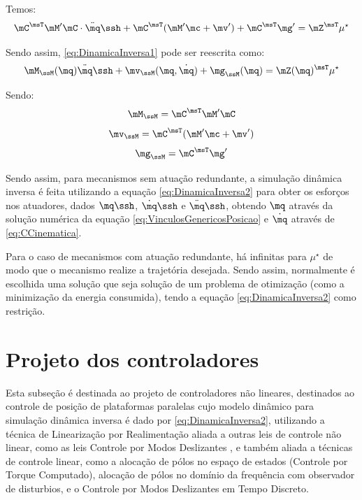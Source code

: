 \documentclass[]{politex}
\begin{document}
Temos:
\begin{equation} \label{eq:DinamicaInversa1}
\mC^\msT \mM' \mC \cdot \ddot{\mq}\ssh + \mC^\msT (   \mM' \mc + \mv' ) + \mC^\msT \mg'  = \mZ^\msT \mu^\star
\end{equation}

Sendo assim, \eqref{eq:DinamicaInversa1} pode ser reescrita como:
\begin{equation} \label{eq:DinamicaInversa2}
\mM_{\ssM} (\mq) \ddot{\mq}\ssh + \mv_{\ssM}(\mq, \dot{\mq}) + \mg_{\ssM}(\mq)   = \mZ(\mq)^{\msT} \mu^\star
\end{equation}

Sendo: 
\begin{equation}
\mM_{\ssM}  =  \mC^\msT \mM' \mC
\end{equation}
\begin{equation}
\mv_{\ssM}  =  \mC^\msT (  \mM'  \mc  + \mv' )
\end{equation}
\begin{equation}
\mg_{\ssM}  = \mC^\msT \mg'
\end{equation}

Sendo assim, para mecanismos sem atuação redundante, a simulação dinâmica inversa é feita utilizando a equação \eqref{eq:DinamicaInversa2} para obter os esforços nos atuadores, dados $\mq\ssh$, $\dot{\mq}\ssh$ e $\ddot{\mq}\ssh$, obtendo $\mq$ através da solução numérica da equação \eqref{eq:VinculosGenericosPosicao} e $\dot{\mq}$ através de \eqref{eq:CCinematica}. 

Para o caso de mecanismos com atuação redundante, há infinitas para $\mu^\star$ de modo que o mecanismo realize a trajetória desejada. Sendo assim, normalmente é escolhida uma solução que seja solução de um problema de otimização (como a minimização da energia consumida), tendo a equação \eqref{eq:DinamicaInversa2} como restrição.


\chapter{Projeto dos controladores}\label{S05-5}

Esta subseção é destinada ao projeto de controladores não lineares, destinados ao controle de posição de plataformas paralelas cujo modelo dinâmico para simulação dinâmica inversa é dado por \eqref{eq:DinamicaInversa2}, utilizando a técnica de Linearização por Realimentação aliada a outras leis de controle não linear, como as leis Controle por Modos Deslizantes \cite{Slotini, Utkin}, e também aliada a técnicas de controle linear, como a alocação de pólos no espaço de estados (Controle por Torque Computado), alocação de pólos no domínio da frequência com observador de disturbios, e o Controle por Modos Deslizantes em Tempo Discreto.
\end{document}
